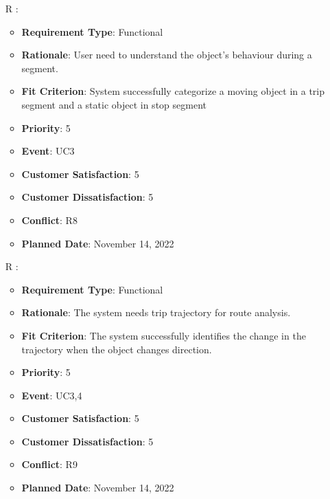 \documentclass[12pt, titlepage]{article}
\newcounter{reqnum} %
\begin{document}
\begin{itemize}
\item[R\refstepcounter{reqnum}\thereqnum
\label{R_Outputs_2}:] 
\begin{itemize}
    \item \textbf{Requirement Type}: Functional
    \item \textbf{Rationale}: User need to understand the object's behaviour during a segment.
    \item \textbf{Fit Criterion}: System successfully categorize a moving object in a trip segment and a static object in stop segment
    \item \textbf{Priority}: 5
    \item \textbf{Event}: UC3
    \item \textbf{Customer Satisfaction}: 5
    \item \textbf{Customer Dissatisfaction}: 5
    \item \textbf{Conflict}: R8
    \item \textbf{Planned Date}: November 14, 2022
\end{itemize}

\item[R\refstepcounter{reqnum}\thereqnum
\label{R_Inputs_1}:] 
\begin{itemize}
    \item \textbf{Requirement Type}: Functional
    \item \textbf{Rationale}: The system needs trip trajectory for route analysis. 
    \item \textbf{Fit Criterion}: The system successfully identifies the change in the trajectory when the object changes direction. 
    \item \textbf{Priority}: 5
    \item \textbf{Event}: UC3,4
    \item \textbf{Customer Satisfaction}: 5
    \item \textbf{Customer Dissatisfaction}: 5
    \item \textbf{Conflict}: R9
    \item \textbf{Planned Date}: November 14, 2022
\end{itemize}


\end{itemize}
\end{document}

